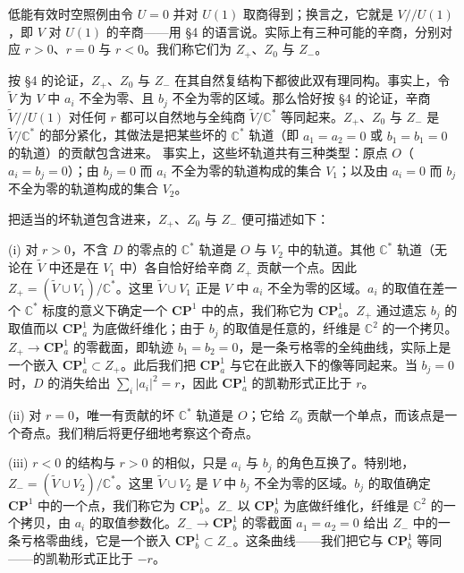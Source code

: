 低能有效时空照例由令 $U=0$ 并对 $U(1)$ 取商得到；换言之，它就是 $V//U(1)$，即 $V$ 对
\label{op:68}
$U(1)$ 的辛商——用 §4 的语言说。实际上有三种可能的辛商，分别对应 $r>0$、$r=0$ 与 $r<0$。我们称它们为 $Z_{+}$、$Z_{0}$ 与 $Z_{-}$。

按 §4 的论证，$Z_{+}$、$Z_{0}$ 与 $Z_{-}$ 在其自然复结构下都彼此双有理同构。事实上，令 $\tilde V$ 为 $V$ 中 $a_{i}$ 不全为零、且 $b_{j}$ 不全为零的区域。那么恰好按 §4 的论证，辛商 $\tilde V//U(1)$ 对任何 $r$ 都可以自然地与全纯商 $\tilde V/\mathbb{C}^{*}$ 等同起来。$Z_{+}$、$Z_{0}$ 与 $Z_{-}$ 是 $\tilde V/\mathbb{C}^{*}$ 的部分紧化，其做法是把某些坏的 $\mathbb{C}^{*}$ 轨道（即 $a_{1}=a_{2}=0$ 或 $b_{1}=b_{1}=0$ 的轨道）的贡献包含进来。
事实上，这些坏轨道共有三种类型：原点 $O$（$a_{i}=b_{j}=0$）；由 $b_{j}=0$ 而 $a_{i}$ 不全为零的轨道构成的集合 $V_{1}$；以及由 $a_{i}=0$ 而 $b_{j}$ 不全为零的轨道构成的集合 $V_{2}$。

把适当的坏轨道包含进来，$Z_{+}$、$Z_{0}$ 与 $Z_{-}$ 便可描述如下：

(i) 对 $r>0$，不含 $D$ 的零点的 $\mathbb{C}^{*}$ 轨道是 $O$ 与 $V_{2}$ 中的轨道。其他 $\mathbb{C}^{*}$ 轨道（无论在 $\tilde V$ 中还是在 $V_{1}$ 中）各自恰好给辛商 $Z_{+}$ 贡献一个点。因此 $Z_{+}=(\tilde V\cup V_{1})/\mathbb{C}^{*}$。这里 $\tilde V\cup V_{1}$ 正是 $V$ 中 $a_{i}$ 不全为零的区域。$a_{i}$ 的取值在差一个 $\mathbb{C}^{*}$ 标度的意义下确定一个 $\mathbf{CP}^{1}$ 中的点，我们称它为 $\mathbf{CP}^{1}_{a}$。$Z_{+}$ 通过遗忘 $b_{j}$ 的取值而以 $\mathbf{CP}^{1}_{a}$ 为底做纤维化；由于 $b_{j}$ 的取值是任意的，纤维是 $\mathbb{C}^{2}$ 的一个拷贝。$Z_{+}\to\mathbf{CP}^{1}_{a}$ 的零截面，即轨迹 $b_{1}=b_{2}=0$，是一条亏格零的全纯曲线，实际上是一个嵌入 $\mathbf{CP}^{1}_{a}\subset Z_{+}$。此后我们把 $\mathbf{CP}^{1}_{a}$ 与它在此嵌入下的像等同起来。当 $b_{j}=0$ 时，$D$ 的消失给出 $\sum_{i}|a_{i}|^{2}=r$，因此 $\mathbf{CP}^{1}_{a}$ 的凯勒形式正比于 $r$。

(ii) 对 $r=0$，唯一有贡献的坏 $\mathbb{C}^{*}$ 轨道是 $O$；它给 $Z_{0}$ 贡献一个单点，而该点是一个奇点。我们稍后将更仔细地考察这个奇点。

(iii) $r<0$ 的结构与 $r>0$ 的相似，只是 $a_{i}$ 与 $b_{j}$ 的角色互换了。特别地，$Z_{-}=(\tilde V\cup V_{2})/\mathbb{C}^{*}$。这里 $\tilde V\cup V_{2}$ 是 $V$ 中 $b_{j}$ 不全为零的区域。$b_{j}$ 的取值确定
\label{op:69}
$\mathbf{CP}^{1}$ 中的一个点，我们称它为 $\mathbf{CP}^{1}_{b}$。$Z_{-}$ 以 $\mathbf{CP}^{1}_{b}$ 为底做纤维化，纤维是 $\mathbb{C}^{2}$ 的一个拷贝，由 $a_{i}$ 的取值参数化。$Z_{-}\to\mathbf{CP}^{1}_{b}$ 的零截面 $a_{1}=a_{2}=0$ 给出 $Z_{-}$ 中的一条亏格零曲线，它是一个嵌入 $\mathbf{CP}^{1}_{b}\subset Z_{-}$。这条曲线——我们把它与 $\mathbf{CP}^{1}_{b}$ 等同——的凯勒形式正比于 $-r$。

